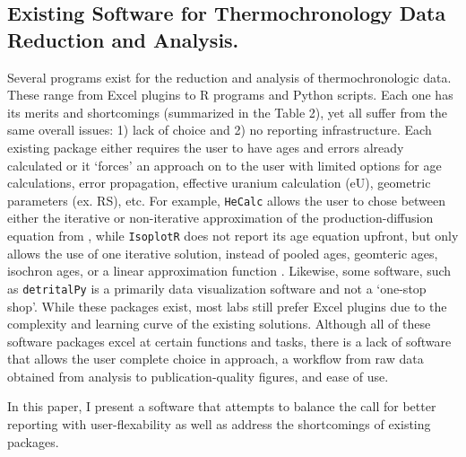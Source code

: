 \documentclass[12pt]{article}
\begin{document}
\subsection{Existing Software for Thermochronology Data Reduction and Analysis. }
Several programs exist for the reduction and analysis of thermochronologic data. These range from Excel plugins to R programs and Python scripts. Each one has its merits and shortcomings (summarized in the Table 2), yet all suffer from the same overall issues: 1) lack of choice and 2) no reporting infrastructure. Each existing package either requires the user to have ages and errors already calculated or it `forces' an approach on to the user with limited options for age calculations, error propagation, effective uranium calculation (eU), geometric parameters (ex. RS), etc. For example, \texttt{HeCalc} \citep{martinetal2023} allows the user to chose between either the iterative or non-iterative approximation of the production-diffusion equation from \cite{meestersanddunai2002a}, while \texttt{IsoplotR} \citep{vermeesch2018} does not report its age equation upfront, but only allows the use of one iterative solution, instead of pooled ages, geomteric ages, isochron ages, or a linear approximation function \citep{vermeesch2008}. Likewise, some software, such as \texttt{detritalPy} \citep{sharmanetal2018} is a primarily data visualization software and not a `one-stop shop'. While these packages exist, most labs still prefer Excel plugins due to the complexity and learning curve of the existing solutions. Although all of these software packages excel at certain functions and tasks, there is a lack of software that allows the user complete choice in approach, a workflow from raw data obtained from analysis to publication-quality figures, and ease of use. 

In this paper, I present a software that attempts to balance the call for better reporting with user-flexability as well as address the shortcomings of existing packages. 
\end{document}
